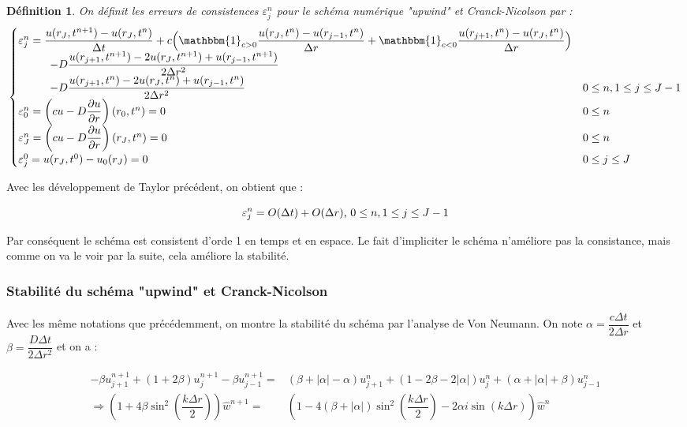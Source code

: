 \documentclass[a4paper,fleqn,leqno]{article}
\newtheorem*{definition}{Définition}
\begin{document}
\begin{definition}
On définit les erreurs de consistences $\varepsilon^n_j$ pour le schéma numérique "upwind" et Cranck-Nicolson par :
\begin{equation*}
\begin{cases}
\varepsilon^n_j = \dfrac{u(r_J,t^{n+1}) - u(r_J,t^n)}{\Delta t} +c \Big( \mathbbm{1}_{c>0}\dfrac{u(r_J,t^n) - u(r_{j-1},t^n)}{\Delta r}+\mathbbm{1}_{c<0}\dfrac{u(r_{j+1},t^n) - u(r_J,t^n)}{\Delta r}\Big)  \\ \hspace{1cm} -D\dfrac{u(r_{j+1},t^{n+1})-2u(r_J,t^{n+1}) + u(r_{j-1},t^{n+1})}{2\Delta r^2}  \\ \hspace{1cm} - D\dfrac{u(r_{j+1},t^n)-2u(r_J,t^n) + u(r_{j-1},t^n)}{2\Delta r^2} 
& 0\leq n, 1\leq j\leq J-1 \\
\varepsilon^n_0 = \left(cu-D\dfrac{\partial u}{\partial r}\right)(r_0,t^n)=0 & 0\leq n \\
\varepsilon^n_J = \left(cu-D\dfrac{\partial u}{\partial r}\right)(r_J,t^n)=0 & 0\leq n \\
\varepsilon^0_j = u(r_J,t^0) - u_0(r_J) = 0 & 0\leq j\leq J \\
\end{cases}
\end{equation*}
\end{definition}

Avec les développement de Taylor précédent, on obtient que :

\[\varepsilon^n_j = O(\Delta t) + O(\Delta r)$, $ 0\leq n, 1\leq j\leq J-1\]

Par conséquent le schéma est consistent d'orde 1 en temps et en espace. Le fait d'impliciter le schéma n'améliore pas la consistance, mais comme on va le voir par la suite, cela améliore la stabilité.

\subsubsection{Stabilité du schéma "upwind" et Cranck-Nicolson}

Avec les même notations que précédemment, on montre la stabilité du schéma par l'analyse de Von Neumann.
On note $\alpha = \dfrac{c\Delta t}{2\Delta r}$ et $\beta = \dfrac{D\Delta t}{2\Delta r^2}$ et on a :

\begin{equation*}
\begin{array}{rl}
-\beta u^{n+1}_{j+1} + (1 + 2\beta)u^{n+1}_j -\beta u^{n+1}_{j-1} = & (\beta+|\alpha|-\alpha)u^n_{j+1} + (1 - 2\beta -2|\alpha|)u^n_j + (\alpha + |\alpha| + \beta)u^n_{j-1}\\
\Rightarrow \left(1 + 4\beta\sin^2(\dfrac{k\Delta r}{2}) \right)\hat{w}^{n+1} =& \left (1 - 4(\beta + |\alpha|)\sin^2(\dfrac{k\Delta r}{2})- 2\alpha i\sin(k\Delta r)\right)\hat{w}^n\\
\end{array}
\end{equation*}
\end{document}

